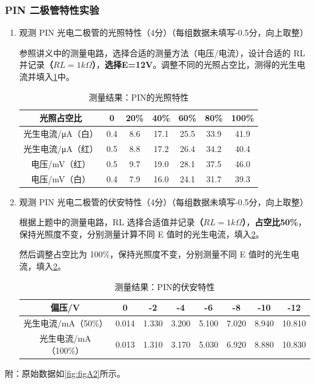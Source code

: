 \documentclass[dvipsnames, svgnames,a4paper,11pt]{article}
\begin{document}
	\subsubsection{PIN 二极管特性实验}
	\begin{enumerate}
		\item 观测 PIN 光电二极管的光照特性（4分）（每组数据未填写-0.5分，向上取整）
		
		参照讲义中的测量电路，选择合适的测量方法（电压/电流），设计合适的 RL并记录\textbf{（$RL=1k\Omega$）}，\textbf{选择E=12V}。调整不同的光照占空比，测得的光生电流并填入\cref{tab:tab4}中。
		
		\begin{table}[h]
			\centering
			\caption{测量结果：PIN的光照特性}
			\label{tab:tab4}
			\begin{tabular}{|c|c|c|c|c|c|c|}
				\hline
				光照占空比 & 0 & 20\% & 40\% & 60\% & 80\% & 100\% \\
				\hline
				光生电流/μA（白） & 0.4 & 8.6 & 17.1 & 25.5 & 33.9 & 41.9 \\
				\hline
				光生电流/μA（红） & 0.5 & 8.8 & 17.2 & 26.4 & 34.2 & 40.4 \\
				\hline
				电压/mV（红） & 0.5 & 9.7 & 19.0 & 28.1 & 37.5 & 46.0 \\
				\hline
				电压/mV（白） & 0.4 & 7.9 & 16.0 & 24.1 & 31.7 & 39.3 \\
				\hline
			\end{tabular}
		\end{table}
		
		\item 观测 PIN 光电二极管的伏安特性（4分）（每组数据未填写-0.5分，向上取整）
		
		根据上题中的测量电路，RL 选择合适值并记录\textbf{（$RL=1k\Omega$）}，\textbf{占空比50\%}，保持光照度不变，分别测量计算不同 E 值时的光生电流，填入\cref{tab:tab5}。
		
		然后调整占空比为 100\%，保持光照度不变，分别测量不同 E 值时的光生电流，填入\cref{tab:tab5}。
		
		\begin{table}[h]
			\centering
			\caption{测量结果：PIN的伏安特性}
			\label{tab:tab5}
			\begin{tabular}{|c|c|c|c|c|c|c|c|}
				\hline
				偏压/V & 0 & -2 & -4 & -6 & -8 & -10 & -12 \\
				\hline
				光生电流/mA（50\%） & 0.014 & 1.330 & 3.200 & 5.100 & 7.020 & 8.940 & 10.810 \\
				\hline
				光生电流/mA（100\%） & 0.013 & 1.310 & 3.170 & 5.030 & 6.920 & 8.880 & 10.830 \\
				\hline
			\end{tabular}
		\end{table}
		
	\end{enumerate}
	附：原始数据如\cref{fig:figA2}所示。
	
\end{document}

